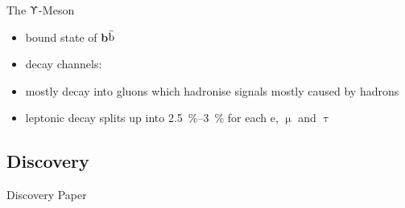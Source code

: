 \begin{frame}{The $\Upupsilon$-Meson}
 
	\begin{minipage}[c][.2\textheight]{.8\textwidth}
	 	\begin{itemize}
			\item bound state of \textbf{b$\bar{\text{b}}$}\vspace*{10pt}
			\item decay channels:
		\end{itemize}
	\end{minipage}
	\begin{minipage}{.18\textwidth}
	\end{minipage}
	
	\begin{figure}
	\end{figure}
	\begin{itemize}\itemfill
		\item mostly decay into gluons which hadronise \ra signals mostly caused by hadrons
		\item leptonic decay splits up into \SIrange{2.5}{3}{\%} for each e, $\upmu$ and $\uptau$
	\end{itemize}

\end{frame}

\subsection{Discovery}
\begin{frame}{Discovery Paper}

	
\end{frame}

